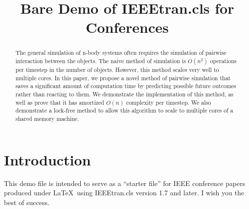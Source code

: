 \documentclass[conference]{IEEEtran}
\begin{document}
%
\title{Bare Demo of IEEEtran.cls for Conferences}


\author{
\and{}
}

\maketitle


\begin{abstract} %
The general simulation of n-body systems often requires the simulation of pairwise interaction between the objects.  
The naive method of simulation is $O(n^2)$ operations per timestep in the number of objects.  However, this method scales very well to multiple cores.
In this paper, we propose a novel method of pairwise simulation that saves a significant amount of computation time by predicting possible future outcomes rather
than reacting to them.  We demonstrate the implementation of this method, as well as prove that it has amortized $O(n)$ complexity per timestep.  We also demonstrate
a lock-free method to allow this algorithm to scale to multiple cores of a shared memory machine.
\end{abstract}

\IEEEpeerreviewmaketitle


\section{Introduction}

This demo file is intended to serve as a ``starter file''
for IEEE conference papers produced under \LaTeX\ using
IEEEtran.cls version 1.7 and later.
I wish you the best of success.
\end{document}
